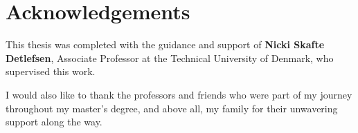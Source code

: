 \section*{Acknowledgements}
This thesis was completed with the guidance and support of \textbf{Nicki Skafte Detlefsen}, Associate Professor at the Technical University of Denmark, who supervised this work.

\vspace{1em}
I would also like to thank the professors and friends who were part of my journey throughout my master's degree, and above all, my family for their unwavering support along the way.
